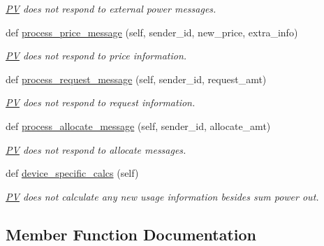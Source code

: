 \begin{DoxyCompactItemize}
\begin{DoxyCompactList}\small\item\em \hyperlink{class_build_1_1_objects_1_1pv_1_1_p_v}{PV} does not respond to external power messages. \end{DoxyCompactList}\item 
def \hyperlink{class_build_1_1_objects_1_1pv_1_1_p_v_a5f41b238d5d48ac989782e1c6fffaa54}{process\+\_\+price\+\_\+message} (self, sender\+\_\+id, new\+\_\+price, extra\+\_\+info)
\begin{DoxyCompactList}\small\item\em \hyperlink{class_build_1_1_objects_1_1pv_1_1_p_v}{PV} does not respond to price information. \end{DoxyCompactList}\item 
def \hyperlink{class_build_1_1_objects_1_1pv_1_1_p_v_ab560ae3ebbbb4c57382daa39d39fe654}{process\+\_\+request\+\_\+message} (self, sender\+\_\+id, request\+\_\+amt)
\begin{DoxyCompactList}\small\item\em \hyperlink{class_build_1_1_objects_1_1pv_1_1_p_v}{PV} does not respond to request information. \end{DoxyCompactList}\item 
def \hyperlink{class_build_1_1_objects_1_1pv_1_1_p_v_aabdf52b13172ff2c632d7f7cde732191}{process\+\_\+allocate\+\_\+message} (self, sender\+\_\+id, allocate\+\_\+amt)
\begin{DoxyCompactList}\small\item\em \hyperlink{class_build_1_1_objects_1_1pv_1_1_p_v}{PV} does not respond to allocate messages. \end{DoxyCompactList}\item 
\mbox{\label{class_build_1_1_objects_1_1pv_1_1_p_v_a6ef12cbd9bbcaeba45203b355d434b81}} 
def \hyperlink{class_build_1_1_objects_1_1pv_1_1_p_v_a6ef12cbd9bbcaeba45203b355d434b81}{device\+\_\+specific\+\_\+calcs} (self)
\begin{DoxyCompactList}\small\item\em \hyperlink{class_build_1_1_objects_1_1pv_1_1_p_v}{PV} does not calculate any new usage information besides sum power out. \end{DoxyCompactList}\end{DoxyCompactItemize}


\subsection{Member Function Documentation}
\mbox{\label{class_build_1_1_objects_1_1pv_1_1_p_v_aabdf52b13172ff2c632d7f7cde732191}} 
